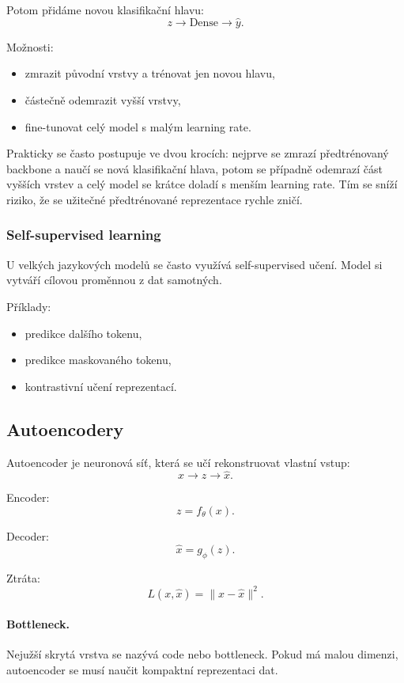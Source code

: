 Potom přidáme novou klasifikační hlavu:
\[
z \rightarrow \text{Dense} \rightarrow \hat y.
\]

Možnosti:
\begin{itemize}
    \item zmrazit původní vrstvy a trénovat jen novou hlavu,
    \item částečně odemrazit vyšší vrstvy,
    \item fine-tunovat celý model s malým learning rate.
\end{itemize}

Prakticky se často postupuje ve dvou krocích: nejprve se zmrazí předtrénovaný backbone a naučí se nová
klasifikační hlava, potom se případně odemrazí část vyšších vrstev a celý model se krátce doladí s menším
learning rate. Tím se sníží riziko, že se užitečné předtrénované reprezentace rychle zničí.

\subsubsection{Self-supervised learning}

U velkých jazykových modelů se často využívá self-supervised učení. Model si vytváří cílovou proměnnou z
dat samotných.

Příklady:
\begin{itemize}
    \item predikce dalšího tokenu,
    \item predikce maskovaného tokenu,
    \item kontrastivní učení reprezentací.
\end{itemize}

\subsection{Autoencodery}

Autoencoder je neuronová síť, která se učí rekonstruovat vlastní vstup:
\[
x \rightarrow z \rightarrow \hat x.
\]

Encoder:
\[
z=f_{\theta}(x).
\]

Decoder:
\[
\hat x=g_{\phi}(z).
\]

Ztráta:
\[
L(x,\hat x)=\|x-\hat x\|^2.
\]

\paragraph{Bottleneck.}
Nejužší skrytá vrstva se nazývá code nebo bottleneck. Pokud má malou dimenzi, autoencoder se musí naučit
kompaktní reprezentaci dat.

